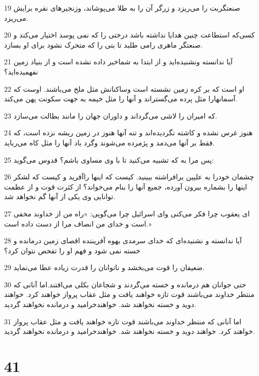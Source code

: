 \par 19 صنعتگربت را می‌ریزد و زرگر آن را به طلا می‌پوشاند، وزنجیرهای نقره برایش می‌ریزد.
\par 20 کسی‌که استطاعت چنین هدایا نداشته باشد درختی را که نمی پوسد اختیار می‌کند و صنعتگر ماهری رامی طلبد تا بتی را که متحرک نشود برای او بسازد.
\par 21 آیا ندانسته ونشنیده‌اید و از ابتدا به شماخبر داده نشده است و از بنیاد زمین نفهمیده‌اید؟
\par 22 او است که بر کره زمین نشسته است وساکنانش مثل ملخ می‌باشند. اوست که آسمانهارا مثل پرده می‌گستراند و آنها را مثل خیمه به جهت سکونت پهن می‌کند.
\par 23 که امیران را لاشی می‌گرداند و داوران جهان را مانند بطالت می‌سازد.
\par 24 هنوز غرس نشده و کاشته نگردیده‌اند و تنه آنها هنوز در زمین ریشه نزده است، که فقط بر آنها می‌دمد و پژمرده می‌شوند وگرد باد آنها را مثل کاه می‌رباید.
\par 25 پس مرا به که تشبیه می‌کنید تا با وی مساوی باشم؟ قدوس می‌گوید:
\par 26 چشمان خودرا به علیین برافراشته ببینید. کیست که اینها راآفرید و کیست که لشکر اینها را بشماره بیرون آورده، جمیع آنها را بنام می‌خواند؟ از کثرت قوت و از عظمت توانایی وی یکی از آنها گم نخواهد شد.
\par 27 ‌ای یعقوب چرا فکر می‌کنی و‌ای اسرائیل چرا می‌گویی: «راه من از خداوند مخفی است و خدای من انصاف مرا از دست داده است.»
\par 28 آیا ندانسته و نشنیده‌ای که خدای سرمدی یهوه آفریننده اقصای زمین درمانده و خسته نمی شود و فهم او را تفحص نتوان کرد؟
\par 29 ضعیفان را قوت می‌بخشد و ناتوانان را قدرت زیاده عطا می‌نماید.
\par 30 حتی جوانان هم درمانده و خسته می‌گردند و شجاعان بکلی می‌افتند.اما آنانی که منتظر خداوند می‌باشند قوت تازه خواهند یافت و مثل عقاب پرواز خواهند کرد. خواهند دوید و خسته نخواهند شد. خواهندخرامید و درمانده نخواهند گردید.
\par 31 اما آنانی که منتظر خداوند می‌باشند قوت تازه خواهند یافت و مثل عقاب پرواز خواهند کرد. خواهند دوید و خسته نخواهند شد. خواهندخرامید و درمانده نخواهند گردید.
 
\chapter{41}

